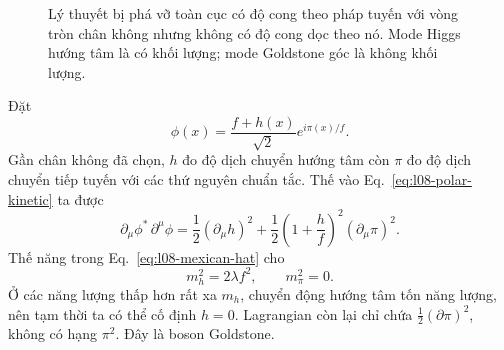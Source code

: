 \begin{figure}[htbp]
\centering
{}
\caption{Lý thuyết bị phá vỡ toàn cục có độ cong theo pháp tuyến với vòng tròn chân không nhưng không có độ cong dọc theo nó. Mode Higgs hướng tâm là có khối lượng; mode Goldstone góc là không khối lượng.}
\label{fig:l08-radial-angular}
\end{figure}

Đặt
\begin{equation}
  \phi(x)=\frac{f+h(x)}{\sqrt2}
           e^{i\pi(x)/f}.
  \label{eq:l08-canonical-polar}
\end{equation}
Gần chân không đã chọn, \(h\) đo độ dịch chuyển hướng tâm còn \(\pi\) đo độ dịch chuyển tiếp tuyến với các thứ nguyên chuẩn tắc. Thế vào Eq.~\eqref{eq:l08-polar-kinetic} ta được
\begin{equation}
  \partial_\mu\phi^*\,\partial^\mu\phi
  =
  \frac12(\partial_\mu h)^2
  +\frac12\left(1+\frac{h}{f}\right)^2
            (\partial_\mu\pi)^2.
  \label{eq:l08-global-expanded}
\end{equation}
Thế năng trong Eq.~\eqref{eq:l08-mexican-hat} cho
\begin{equation}
  m_h^2=2\lambda f^2,
  \qquad
  m_\pi^2=0.
  \label{eq:l08-global-masses}
\end{equation}
Ở các năng lượng thấp hơn rất xa \(m_h\), chuyển động hướng tâm tốn năng lượng, nên tạm thời ta có thể cố định \(h=0\). Lagrangian còn lại chỉ chứa \(\frac12(\partial\pi)^2\), không có hạng \(\pi^2\). Đây là boson Goldstone.

